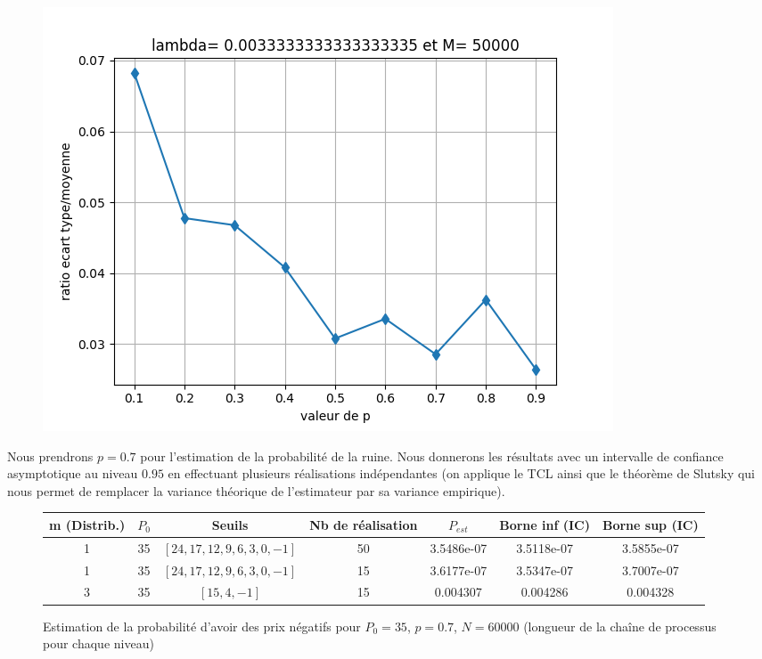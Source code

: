 \documentclass[a4paper,11pt]{article}
\begin{document}
\begin{figure}
\begin{center}
\includegraphics[scale=0.4]{"Q1 MCMC IC i1 precision"}
\end{center}
\end{figure}

Nous prendrons $p=0.7$ pour l'estimation de la probabilité de la ruine. Nous donnerons les résultats avec un intervalle de confiance asymptotique au niveau $0.95$ en effectuant plusieurs réalisations indépendantes (on applique le TCL ainsi que le théorème de Slutsky qui nous permet de remplacer la variance théorique de l'estimateur par sa variance empirique).

\begin{figure}
\begin{center}
\caption{Estimation de la probabilité d'avoir des prix négatifs pour $P_0=35$, $p=0.7$, $N=60000$ (longueur de la chaîne de processus pour chaque niveau)} 
\begin{tabular}{|c|c|c|c|c|c|c|}
\hline
m (Distrib.) & $P_{0}$ & Seuils & Nb de réalisation & $P_{est}$ & Borne inf (IC) & Borne sup (IC) \\
\hline
1 & 35 & $[24, 17, 12, 9, 6, 3, 0, -1]$ & 50 & 3.5486e-07 & 3.5118e-07 & 3.5855e-07 \\
\hline
1 & 35 & $[24, 17, 12, 9, 6, 3, 0, -1]$ & 15 & 3.6177e-07 & 3.5347e-07 & 3.7007e-07 \\
\hline
3 & 35 & $[15,4, -1]$ & 15 & 0.004307 & 0.004286 & 0.004328 \\
\hline
\end{tabular}
\end{center}
\end{figure}
\end{document}
